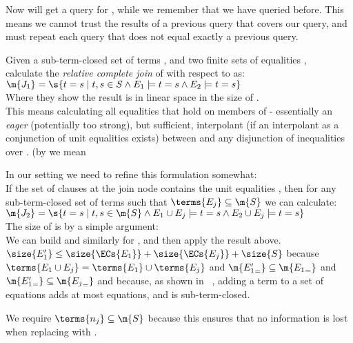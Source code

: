Now  will get a query for , while we remember that we have queried  before.
This means we cannot trust the results of a previous query that covers our query, and must repeat each query that does not equal exactly a previous query.

Given a sub-term-closed set of terms , and two finite sets of equalities , ~\cite{GulwaniTiwariNecula04} calculate the \emph{relative complete join} of  with respect to  as:\\
$\m{J_1} = \s{t=s \mid t,s \in S \land E_1 \models t=s \land E_2 \models t=s }$\\
Where they show the result is in linear space in the size of .\\
This means calculating all equalities that hold on members of  - essentially an 
\emph{eager} (potentially too strong), but sufficient, interpolant (if an interpolant as a conjunction of unit equalities exists) between  and any disjunction of inequalities over .
(by  we mean 


In our setting we need to refine this formulation somewhat:\\
If the set of clauses  at the join node  contains the unit equalities , 
then for any sub-term-closed set of terms  such that $\terms{E_j} \subseteq \m{S}$ we can calculate:\\
$\m{J_2} = \s{t=s \mid t,s \in \m{S} \land E_1 \cup E_j \models t=s \land E_2 \cup E_j \models t=s }$\\
The size of  is  by a simple argument:\\
We can build  and similarly for , and then apply the result above.
$\size{E_1'} \le \size{\ECs{E_1}} + \size{\ECs{E_j}} + \size{S}$ because 
$\terms{E_1 \cup E_j} = \terms{E_1} \cup \terms{E_j}$ and $\m{{E_1'}_=} \subseteq \m{{E_1}_=}$ and $\m{{E_1'}_=} \subseteq \m{{E_j}_=}$ 
and because, as shown in ~\cite{GulwaniTiwariNecula04}, adding a term  to a set of equations adds at most  equations, and  is sub-term-closed.

We require $\terms{n_j} \subseteq \m{S}$ because this ensures that no information is lost when replacing  with .

\vspace{1pt}

